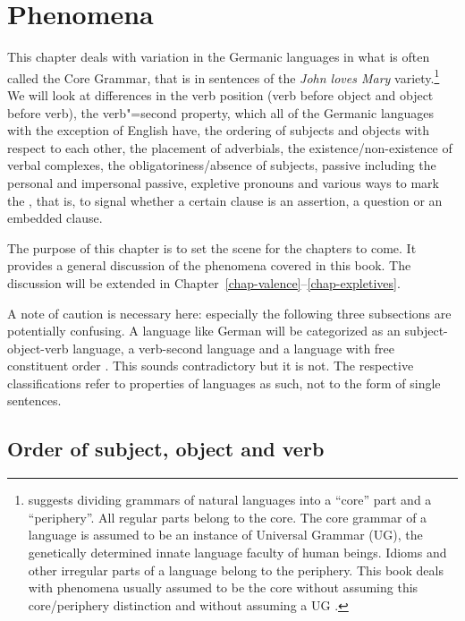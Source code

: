 
\settowidth{}


\chapter{Phenomena}

This chapter deals with variation in the Germanic languages in what is often called the Core
Grammar, that is in sentences of the \emph{John loves Mary} variety.\footnote{%
  \citet[--8]{Chomsky81a} suggests dividing grammars of natural languages into a ``core'' part and a ``periphery''.
All regular parts belong to the core. The core grammar of a language is assumed to be an instance of
Universal Grammar (UG), the genetically determined innate language faculty of human beings. Idioms
and other irregular parts of a language belong to the periphery. This book deals with phenomena
usually assumed to be the core without assuming this core/periphery distinction and without assuming
a UG \citep{MuellerKernigkeit,MuellerCoreGram}.
} We will look at differences in
the verb position (verb before object and object before verb), the verb"=second property, which
all of the Germanic languages with the exception of English have, the ordering of subjects and
objects with respect to each other, the placement of adverbials, the existence/non-existence of
verbal complexes, the obligatoriness/absence of subjects, passive including the personal and
impersonal passive, expletive pronouns and various ways to mark the , that is, to
signal whether a certain clause is an assertion, a question or an embedded clause.

The purpose of this chapter is to set the scene for the chapters to come. It provides a general
discussion of the phenomena covered in this book. The discussion will be extended in Chapter~\ref{chap-valence}--\ref{chap-expletives}.

A note of caution is necessary here: especially the following three subsections are potentially
confusing. A language like German will be categorized as an subject-object-verb language, a verb-second language and
a language with free constituent order \citep{Haftka96a}. This sounds contradictory but it is not. The respective
classifications refer to properties of languages as such, not to the form of single sentences.

\section{Order of subject, object and verb}
\label{sec-intro-svo}

